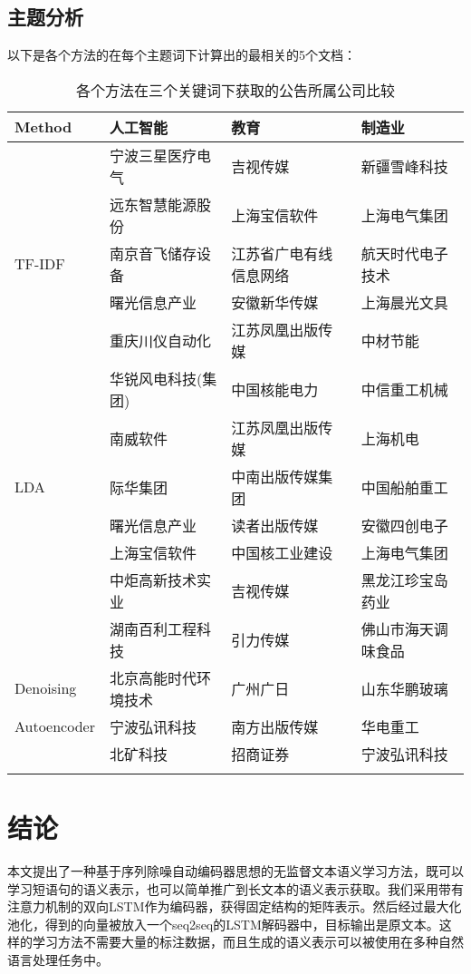 \documentclass[UTF8,11pt,a4paper,nofonts]{ctexart}
\begin{document}
\subsection{主题分析}


以下是各个方法的在每个主题词下计算出的最相关的5个文档：


\begin{longtable}{|p{5 em}|l|l|l|}
\hline
Method & 人工智能 & 教育 & 制造业 \\
\hline
 & 宁波三星医疗电气 & 吉视传媒 & 新疆雪峰科技 \\ 
 & 远东智慧能源股份 & 上海宝信软件 &  上海电气集团\\ 
TF-IDF & 南京音飞储存设备 & 江苏省广电有线信息网络 & 航天时代电子技术 \\ 
 & 曙光信息产业 & 安徽新华传媒 & 上海晨光文具 \\  
 & 重庆川仪自动化 & 江苏凤凰出版传媒 & 中材节能 \\ 
\hline
 & 华锐风电科技(集团) & 中国核能电力 & 中信重工机械 \\ 
 & 南威软件 & 江苏凤凰出版传媒 & 上海机电 \\ 
LDA & 际华集团 & 中南出版传媒集团 & 中国船舶重工 \\ 
 & 曙光信息产业 & 读者出版传媒 & 安徽四创电子 \\  
 & 上海宝信软件 & 中国核工业建设 & 上海电气集团 \\ 
\hline
 & 中炬高新技术实业 & 吉视传媒 & 黑龙江珍宝岛药业 \\ 
 & 湖南百利工程科技 & 引力传媒 & 佛山市海天调味食品 \\ 
Denoising & 北京高能时代环境技术 & 广州广日 & 山东华鹏玻璃 \\ 
Autoencoder & 宁波弘讯科技 & 南方出版传媒 & 华电重工 \\  
 & 北矿科技 & 招商证券 & 宁波弘讯科技 \\ 
\hline
\caption{各个方法在三个关键词下获取的公告所属公司比较}\label{tbl:01}
\end{longtable}




\section{结论}

本文提出了一种基于序列除噪自动编码器思想的无监督文本语义学习方法，既可以学习短语句的语义表示，也可以简单推广到长文本的语义表示获取。我们采用带有注意力机制的双向LSTM作为编码器，获得固定结构的矩阵表示。然后经过最大化池化，得到的向量被放入一个seq2seq的LSTM解码器中，目标输出是原文本。这样的学习方法不需要大量的标注数据，而且生成的语义表示可以被使用在多种自然语言处理任务中。
\end{document}
